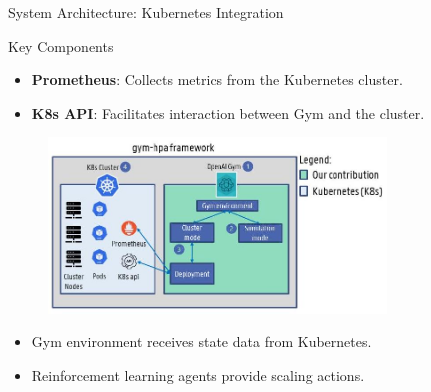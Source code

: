 \documentclass{beamer}
\begin{document}
\begin{frame}{System Architecture: Kubernetes Integration}
    \begin{block}{Key Components}
        \begin{itemize}
            \item \textbf{Prometheus}: Collects metrics from the Kubernetes cluster.
            \item \textbf{K8s API}: Facilitates interaction between Gym and the cluster.
        \end{itemize}
    \end{block}
    \begin{figure}
        \includegraphics[width=0.8\textwidth]{images/2024_11_17_21ad14b6196e5740bf69g-4.jpg} %
    \end{figure}
    \begin{itemize}
        \item Gym environment receives state data from Kubernetes.
        \item Reinforcement learning agents provide scaling actions.
    \end{itemize}
\end{frame}
\end{document}
